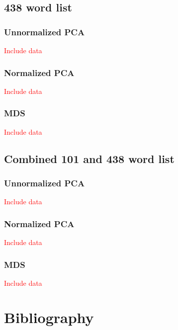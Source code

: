 \documentclass[10pt,letterpaper]{book}
\newcommand{\todo}[1]{\textcolor{red}{#1}}
\begin{document}
\section{438 word list}
\subsection{Unnormalized PCA}
\label{app:rankedwordlists:438words:unnormalized}
\todo{Include data}
\subsection{Normalized PCA}
\label{app:rankedwordlists:438words:normalized}
\todo{Include data}
\subsection{MDS}
\label{app:rankedwordlists:438words:mds}
\todo{Include data}

\section{Combined 101 and 438 word list}
\subsection{Unnormalized PCA}
\label{app:rankedwordlists:438and101words:unnormalized}
\todo{Include data}
\subsection{Normalized PCA}
\label{app:rankedwordlists:438and101words:normalized}
\todo{Include data}
\subsection{MDS}
\label{app:rankedwordlists:438and101words:mds}
\todo{Include data}


\chapter{Bibliography}


\end{document}
